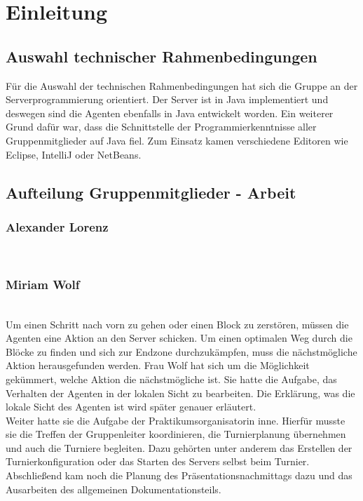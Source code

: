 \section{Einleitung}

\subsection{Auswahl technischer Rahmenbedingungen}
Für die Auswahl der technischen Rahmenbedingungen hat sich die Gruppe an der Serverprogrammierung orientiert. Der Server ist in Java implementiert und deswegen sind die Agenten ebenfalls in Java entwickelt worden. Ein weiterer Grund dafür war, dass die Schnittstelle der Programmierkenntnisse aller Gruppenmitglieder auf Java fiel. Zum Einsatz kamen verschiedene Editoren wie Eclipse\cite{eclipse}, IntelliJ\cite{intellij} oder NetBeans\cite{netbeans}.

\subsection{Aufteilung Gruppenmitglieder - Arbeit}
\subsubsection{Alexander Lorenz} ~\\
\subsubsection{Miriam Wolf} ~\\
Um einen Schritt nach vorn zu gehen oder einen Block zu zerstören, müssen die Agenten eine Aktion an den Server schicken. Um einen optimalen Weg durch die Blöcke zu finden und sich zur Endzone durchzukämpfen, muss die nächstmögliche Aktion herausgefunden werden. Frau Wolf hat sich um die Möglichkeit gekümmert, welche Aktion die nächstmögliche ist. Sie hatte die Aufgabe, das Verhalten der Agenten in der lokalen Sicht zu bearbeiten. Die Erklärung, was die lokale Sicht des Agenten ist wird später genauer erläutert. \\

Weiter hatte sie die Aufgabe der Praktikumsorganisatorin inne. Hierfür musste sie die Treffen der Gruppenleiter koordinieren, die Turnierplanung übernehmen und auch die Turniere begleiten. Dazu gehörten unter anderem das Erstellen der Turnierkonfiguration oder das Starten des Servers selbst beim Turnier. Abschließend kam noch die Planung des Präsentationsnachmittags dazu und das Ausarbeiten des allgemeinen Dokumentationsteils.


